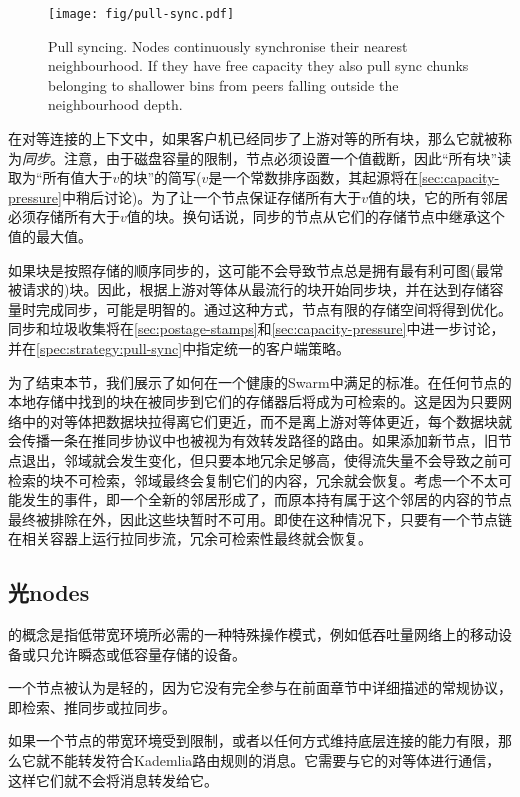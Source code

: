 \begin{figure}[htbp]
   \centering
   \texttt{[image: fig/pull-sync.pdf]}
   \caption[Pull syncing \statusgreen]{Pull syncing. Nodes continuously synchronise their nearest neighbourhood. If they have free capacity they also pull sync chunks belonging to shallower bins from peers falling outside the neighbourhood depth.}
   \label{fig:pull-syncing}
\end{figure}

在对等连接的上下文中，如果客户机已经同步了上游对等的所有块，那么它就被称为\emph{同步}。注意，由于磁盘容量的限制，节点必须设置一个值截断，因此“所有块”读取为“所有值大于$v$的块”的简写($v$是一个常数排序函数，其起源将在\ref{sec:capacity-pressure}中稍后讨论)。为了让一个节点保证存储所有大于$v$值的块，它的所有邻居必须存储所有大于$v$值的块。换句话说，同步的节点从它们的存储节点中继承这个值的最大值。 

如果块是按照存储的顺序同步的，这可能不会导致节点总是拥有最有利可图(最常被请求的)块。因此，根据上游对等体从最流行的块开始同步块，并在达到存储容量时完成同步，可能是明智的。通过这种方式，节点有限的存储空间将得到优化。同步和垃圾收集将在\ref{sec:postage-stamps}和\ref{sec:capacity-pressure}中进一步讨论，并在\ref{spec:strategy:pull-sync}中指定统一的客户端策略。

为了结束本节，我们展示了如何在一个健康的Swarm中满足的标准。在任何节点的本地存储中找到的块在被同步到它们的存储器后将成为可检索的。这是因为只要网络中的对等体把数据块拉得离它们更近，而不是离上游对等体更近，每个数据块就会传播一条在推同步协议中也被视为有效转发路径的路由。如果添加新节点，旧节点退出，邻域就会发生变化，但只要本地冗余足够高，使得流失量不会导致之前可检索的块不可检索，邻域最终会复制它们的内容，冗余就会恢复。考虑一个不太可能发生的事件，即一个全新的邻居形成了，而原本持有属于这个邻居的内容的节点最终被排除在外，因此这些块暂时不可用。即使在这种情况下，只要有一个节点链在相关容器上运行拉同步流，冗余可检索性最终就会恢复。

\subsection{光nodes\statusgreen}
\label{sec:light}

的概念是指低带宽环境所必需的一种特殊操作模式，例如低吞吐量网络上的移动设备或只允许瞬态或低容量存储的设备。

一个节点被认为是轻的，因为它没有完全参与在前面章节中详细描述的常规协议，即检索、推同步或拉同步。 

如果一个节点的带宽环境受到限制，或者以任何方式维持底层连接的能力有限，那么它就不能转发符合Kademlia路由规则的消息。它需要与它的对等体进行通信，这样它们就不会将消息转发给它。 

